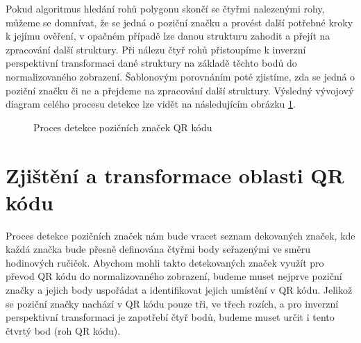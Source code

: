 Pokud algoritmus hledání rohů polygonu skončí se čtyřmi nalezenými rohy, můžeme
se domnívat, že se jedná o poziční značku a provést další potřebné kroky k 
jejímu ověření, v opačném případě lze danou strukturu zahodit a přejít na
zpracování další struktury. Při nálezu čtyř rohů přistoupíme k inverzní
perspektivní transformaci dané struktury na základě těchto bodů do
normalizovaného zobrazení. Šablonovým porovnáním poté zjistíme, zda se
jedná o poziční značku či ne a přejdeme na zpracování další struktury. Výsledný
vývojový diagram celého procesu detekce lze vidět na následujícím obrázku
\ref{QRCodeDetectionProcess}.

\begin{figure}[H]
  \begin{center}
    \caption{Proces detekce pozičních značek QR kódu}
    \label{QRCodeDetectionProcess}
  \end{center}
\end{figure}

\section{Zjištění a transformace oblasti QR kódu}
\label{zjisteniATransformace}

Proces detekce pozičních značek nám bude vracet seznam dekovaných značek, kde
každá značka bude přesně definována čtyřmi body seřazenými ve směru hodinových
ručiček. Abychom mohli takto detekovaných značek využít pro převod QR kódu do
normalizovaného zobrazení, budeme muset nejprve poziční značky a jejich body
uspořádat a identifikovat jejich umístění v QR kódu. Jelikož se poziční značky
nachází v QR kódu pouze tři, ve třech rozích, a pro inverzní perspektivní
transformaci je zapotřebí čtyř bodů, budeme muset určit i tento čtvrtý bod
(roh QR kódu).

